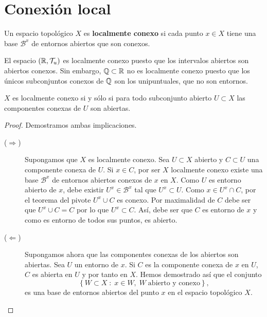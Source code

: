 \section{Conexión local}
\begin{definition}
Un espacio topológico $\displaystyle X $ es \textbf{localmente conexo} si cada punto $\displaystyle x \in X $ tiene una base $\displaystyle \mathcal{B}^{x} $ de entornos abiertos que son conexos. 
\end{definition}
\begin{eg}
El espacio $\displaystyle \left(\mathbb{R}, \mathcal{T}_{u}\right) $ es localmente conexo puesto que los intervalos abiertos son abiertos conexos. Sin embargo, $\displaystyle \mathbb{Q} \subset \mathbb{R} $ no es localmente conexo puesto que los únicos subconjuntos conexos de $\displaystyle \mathbb{Q} $ son los unipuntuales, que no son entornos.
\end{eg}
\begin{prop}
$\displaystyle X $ es localmente conexo si y sólo si para todo subconjunto abierto $\displaystyle U \subset X $ las componentes conexas de $\displaystyle U $ son abiertas.
\end{prop}
\begin{proof}
Demostramos ambas implicaciones.
\begin{description}
\item[($\displaystyle \Rightarrow $)] Supongamos que $\displaystyle X $ es localmente conexo. Sea $\displaystyle U\subset X $ abierto y $\displaystyle C\subset U $ una componente conexa de $\displaystyle U $. Si $\displaystyle x \in C $, por ser $\displaystyle X $ localmente conexo existe una base $\displaystyle \mathcal{B}^{x} $ de entornos abiertos conexos de $\displaystyle x $ en $\displaystyle X $. Como $\displaystyle U $ es entorno abierto de $\displaystyle x $, debe existir $\displaystyle U^{x}\in \mathcal{B}^{x} $ tal que $\displaystyle U^{x}\subset U $. Como $\displaystyle x \in U^{x}\cap C $, por el teorema del pivote $\displaystyle U^{x}\cup C $ es conexo. Por maximalidad de $\displaystyle C $ debe ser que $\displaystyle U^{x}\cup C = C $ por lo que $\displaystyle U^{x}\subset C $. Así, debe ser que $\displaystyle C $ es entorno de $\displaystyle x $ y como es entorno de todos sus puntos, es abierto.
\item[($\displaystyle \Leftarrow $)] Supongamos ahora que las componentes conexas de los abiertos son abiertas. Sea $\displaystyle U $ un entorno de $\displaystyle x $. Si $\displaystyle C $ es la componente conexa de $\displaystyle x $ en $\displaystyle U $, $\displaystyle C $ es abierta en $\displaystyle U $ y por tanto en $\displaystyle X $. Hemos demostrado así que el conjunto 
	\[ \left\{ W\subset X \; : \; x \in W, \; W \; \text{abierto y conexo}\right\}  ,\]
	es una base de entornos abiertos del punto $\displaystyle x $ en el espacio topológico $\displaystyle X $. 
\end{description}
\end{proof}
